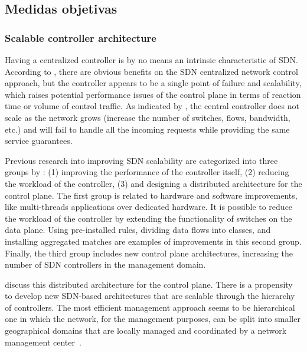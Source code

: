 \subsection{Medidas objetivas}


\subsubsection{Scalable controller architecture}
\label{subsec:distributed}

Having a centralized controller is by no means an intrinsic characteristic of
\ac{SDN}. According to \citet{Kuklinski2014a}, there are obvious benefits on
the \ac{SDN} centralized network control approach, but the controller appears
to be a single point of failure and scalability, which raises potential
performance issues of the control plane in terms of reaction time or volume of
control traffic. As indicated by \citet{Yeganeh2013}, the central controller
does not scale as the network grows (increase the number of switches, flows,
bandwidth, etc.) and will fail to handle all the incoming requests while
providing the same service guarantees.

Previous research into improving \ac{SDN} scalability are categorized into
three groups by \citet{Sato2015}: (1) improving the performance of the
controller itself, (2) reducing the workload of the controller, (3) and
designing a distributed architecture for the control plane. The first group is
related to hardware and software improvements, like multi-threads applications
over dedicated hardware. It is possible to reduce the workload of the
controller by extending the functionality of switches on the data plane. Using
pre-installed rules, dividing data flows into classes, and installing
aggregated matches are examples of improvements in this second group. Finally,
the third group includes new control plane architectures, increasing the number
of \ac{SDN} controllers in the management domain.

\citet{Arslan2015} discuss this distributed architecture for the control plane.
There is a propensity to develop new \ac{SDN}-based architectures that are
scalable through the hierarchy of controllers. The most efficient management
approach seems to be hierarchical one in which the network, for the management
purposes, can be split into smaller geographical domains that are locally
managed and coordinated by a network management center~\cite{Kuklinski2014a}.

